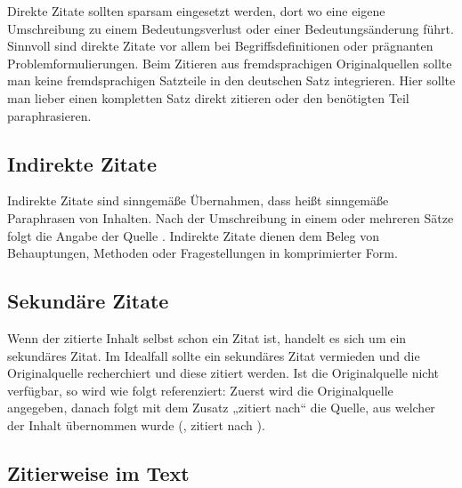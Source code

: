 Direkte Zitate sollten sparsam eingesetzt werden, dort wo eine eigene Umschreibung zu einem Bedeutungsverlust oder einer Bedeutungsänderung führt.
Sinnvoll sind direkte Zitate vor allem bei Begriffsdefinitionen oder prägnanten Problemformulierungen.
Beim Zitieren aus fremdsprachigen Originalquellen sollte man keine fremdsprachigen Satzteile  in den deutschen Satz integrieren.
Hier sollte man lieber einen kompletten Satz direkt zitieren oder den benötigten Teil paraphrasieren.

\subsection{Indirekte Zitate}\label{subsubsec:indirekte}

Indirekte Zitate sind sinngemäße Übernahmen, dass heißt sinngemäße Paraphrasen von Inhalten.
Nach der Umschreibung in einem oder mehreren Sätze folgt die Angabe der Quelle \cite[S. 11]{mustermann2013test}.
Indirekte Zitate dienen dem Beleg von Behauptungen, Methoden oder Fragestellungen in komprimierter Form.

\subsection{Sekundäre Zitate}\label{subsubsec:sekundäre}

Wenn der zitierte Inhalt selbst schon ein Zitat ist, handelt es sich um ein sekundäres Zitat.
Im Idealfall sollte ein sekundäres Zitat vermieden und die Originalquelle recherchiert und diese zitiert werden.
Ist die Originalquelle nicht verfügbar, so wird wie folgt referenziert: Zuerst wird die Originalquelle angegeben, danach folgt mit dem Zusatz „zitiert nach“ die Quelle, aus welcher der Inhalt übernommen wurde (\citealp[S. 11]{mustermann2013test}, zitiert nach \citealp[S. 11]{huber2013buch}).

\subsection{Zitierweise im Text}\label{subsubsec:zitierweise}

